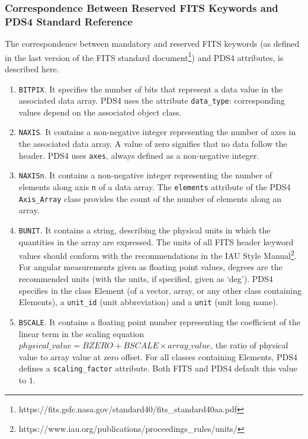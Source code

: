 \subsubsection{Correspondence Between Reserved FITS Keywords and PDS4 Standard Reference}
\label{sssec:stdfitspds4}
The correspondence between mandatory and reserved FITS keywords (as defined in
the last version of the FITS standard document\footnote{https://fits.gsfc.nasa.gov/standard40/fits\_standard40aa.pdf})
and PDS4 attributes, is described here.
\begin{enumerate}
\item{\texttt{BITPIX}.
It specifies the number of bits that represent a data value in
the associated data array.
PDS4 uses the attribute \texttt{data\_type}: corresponding 
values depend on the associated object class.}

\item{\texttt{NAXIS}.
It contains a non-negative integer representing the number of axes in
the associated data array.
A value of zero signifies that no data follow the header.
PDS4 uses \texttt{axes}, always defined as a non-negative integer.}

\item{\texttt{NAXISn}.
It contains a non-negative integer representing the number of
elements along axis \texttt{n} of a data array.
The \texttt{elements} attribute of the PDS4 \texttt{Axis\_Array} class provides
the count of the number of elements along an array.}

\item{\texttt{BUNIT}.
It contains a string, describing the physical units in which the quantities
in the array are expressed.
The units of all FITS header keyword values should conform with the recommendations
in the IAU Style Manual\footnote{https://www.iau.org/publications/proceedings\_rules/units/}.
For angular measurements given as floating point values, degrees are the recommended
units (with the units, if specified, given as `deg').
PDS4 specifies in the class Element (of a vector, array, or any other class
containing Elements), a \texttt{unit\_id}} (unit abbreviation) and a \texttt{unit}
(unit long name).

\item{\texttt{BSCALE}.
It contains a floating point number representing the coefficient of the linear term
in the scaling equation $physical\_value = BZERO + BSCALE \times array\_value$,
the ratio of physical value to array value at zero offset.
For all classes containing Elements, PDS4 defines a \texttt{scaling\_factor}
attribute.
Both FITS and PDS4 default this value to $1$.}


\end{enumerate}
